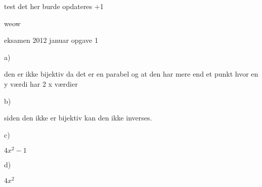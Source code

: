 \documentclass{article}
\begin{document}
test
det her burde opdateres
+1

weow

eksamen 2012 januar
opgave 1 

a)

den er ikke bijektiv da det er en parabel og at den har mere end et punkt
hvor en y værdi har 2 x værdier 

b)

siden den ikke er bijektiv kan den ikke inverses.

c)

$4x^2-1$

d)

$4x^2$
\end{document}
